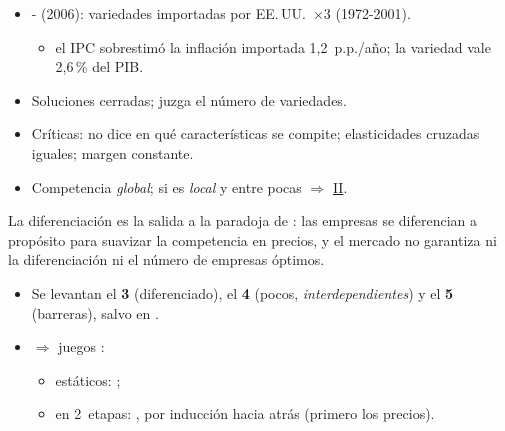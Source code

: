 \documentclass{article}
\begin{document}
\begin{columnas}
\begin{itemize}
\end{itemize}
\begin{itemize}
\item {}- (2006): variedades importadas por EE.\,UU.\ $\times3$ (1972-2001).
  \begin{itemize}
  \item el IPC sobrestimó la inflación importada 1,2~p.p./año; la variedad vale 2,6\,\% del PIB.
  \end{itemize}
\end{itemize}
\begin{itemize}
\item Soluciones cerradas; juzga el número de variedades.
\item Críticas: no dice en qué características se compite; elasticidades cruzadas iguales; margen constante.
\item Competencia \emph{global}; si es \emph{local} y entre pocas $\Rightarrow$ \hyperref[rep:II]{II}.
\end{itemize}

\begin{ideaclave}
La diferenciación es la salida a la paradoja de : las empresas se diferencian a propósito para suavizar la competencia en precios, y el mercado no garantiza ni la diferenciación ni el número de empresas óptimos.
\end{ideaclave}

\begin{itemize}
\item Se levantan el \textbf{3} (diferenciado), el \textbf{4} (pocos, \emph{interdependientes}) y el \textbf{5} (barreras), salvo en .
\item {} $\Rightarrow$ juegos :
  \begin{itemize}
  \item estáticos: ;
  \item en 2~etapas: , por inducción hacia atrás (primero los precios).
  \end{itemize}
\end{itemize}


\end{columnas}
\end{document}
